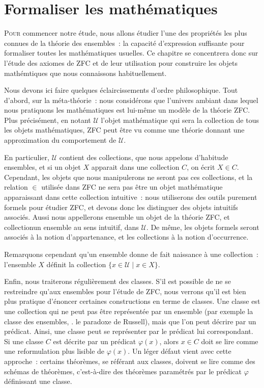 \chapter{Formaliser les mathématiques}
\label{chp.axiomes}

\minitoc

\lettrine{P}{our} commencer notre étude, nous allons étudier l'une des
propriétés les plus connues de la théorie des ensembles~: la capacité
d'expression suffisante pour formaliser toutes les mathématiques usuelles. Ce
chapitre se concentrera donc sur l'étude des axiomes de ZFC et de leur
utilisation pour construire les objets mathémtiques que nous connaissons
habituellement.

Nous devons ici faire quelques éclaircissements d'ordre philosophique. Tout
d'abord, sur la méta-théorie~: nous considérons que l'univers ambiant dans
lequel nous pratiquons les mathématiques est lui-même un modèle de la théorie
ZFC. Plus précisément, en notant $\mathcal U$ l'objet mathématique qui sera la
collection de tous les objets mathématiques, ZFC peut être vu comme une théorie
donnant une approximation du comportement de $\mathcal U$.

En particulier, $\mathcal U$ contient des collections, que nous appelons
d'habitude ensembles, et si un objet $X$ apparait dans une collection $C$, on
écrit $X\in C$. Cependant, les objets que nous manipulerons ne seront pas ces
collections, et la relation $\in$ utilisée dans ZFC ne sera pas \og être un
objet mathématique apparaissant dans cette collection intuitive\fg{}~: nous
utiliserons des outils purement formels pour étudier ZFC, et devons donc les
distinguer des objets intuitifs associés. Aussi nous appellerons \og ensemble\fg
un objet de la théorie ZFC, et \og collection\fg un ensemble au sens intuitif,
dans $\mathcal U$. De même, les objets formels seront associés à la notion
d'appartenance, et les collections à la notion d'occurrence.

Remarquons cependant qu'un ensemble donne de fait naissance à une
collection~: l'ensemble $X$ définit la collection
$\{ x \in\mathcal U\mid x \in X \}$.

Enfin, nous traiterons régulièrement des classes. S'il est possible de ne se
restreindre qu'aux ensembles pour l'étude de ZFC, nous verrons qu'il est bien
plus pratique d'énoncer certaines constructions en terme de classes. Une classe
est une collection qui ne peut pas être représentée par un ensemble (par exemple
la classe des ensembles, . le paradoxe de Russell), mais que l'on
peut décrire par un prédicat. Ainsi, une classe peut se représenter par le
prédicat lui correspondant. Si une classe $C$ est décrite par un prédicat
$\varphi(x)$, alors $x\in C$ doit se lire comme une reformulation plus lisible
de $\varphi(x)$. Un léger défaut vient avec cette approche~: certains théorèmes,
se référant aux classes, doivent se lire comme des schémas de théorèmes,
c'est-à-dire des théorèmes paramétrés par le prédicat $\varphi$ définissant une
classe.

